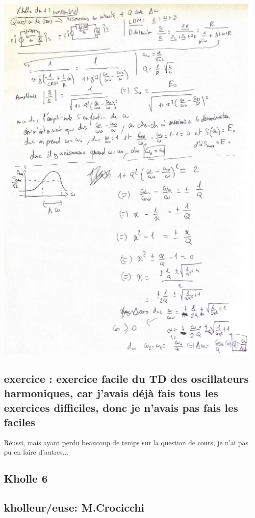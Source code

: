 \documentclass{article}
\begin{document}
\hspace{3cm}
\includegraphics[scale=0.4]{assets/physique/kholle5-1.png} \\

\subsection{exercice : exercice facile du TD des oscillateurs harmoniques, car j'avais déjà fais tous les exercices difficiles, donc je n'avais pas fais les faciles}

Réussi, mais ayant perdu beaucoup de temps sur la question de cours, je n'ai pas pu en faire d'autres...

\subsection{Kholle 6}
\subsection{kholleur/euse: M.Crocicchi}
\end{document}
